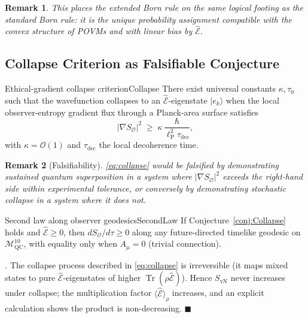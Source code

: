 \documentclass[11pt,a4paper]{article}
\theoremstyle{myrmk}
\newtheorem{remark}{Remark}[section]
\renewenvironment{proof}[1][\proofname]{%
  \par\noindent\textit{#1.}\enspace\ignorespaces}{\hfill$\blacksquare$\par\medskip}
\newcommand{\Mmanifold}{\mathcal{M}^{10}_{\mathrm{QC}}}
\newcommand{\SO}{\nabla S_{\!\mathcal{O}}}
\newcommand{\lP}{\ell_{\mathrm{P}}}
\newcommand{\Tr}{\operatorname{Tr}}
\newcommand{\Ehat}{\hat{\mathcal{E}}}
\newcommand{\ket}[1]{|#1\rangle}
\begin{document}
\begin{remark}
This places the extended Born rule on the same logical footing as the standard Born
rule: it is the unique probability assignment compatible with the convex structure of
POVMs and with linear bias by $\Ehat$.
\end{remark}

\subsection{Collapse Criterion as Falsifiable Conjecture}
\label{sec:collapse}

\begin{conjecture}{Ethical-gradient collapse criterion}{Collapse}
There exist universal constants $\kappa,\tau_0$ such that the wavefunction collapses to
an $\Ehat$-eigenstate $\ket{e_k}$ when the local observer-entropy gradient flux through
a Planck-area surface satisfies
\begin{equation}
  |\SO|^{2}\;\geq\;\kappa\,\frac{\hbar}{\lP^{2}\tau_{\mathrm{dec}}},
  \label{eq:collapse}
\end{equation}
with $\kappa=\mathcal{O}(1)$ and $\tau_{\mathrm{dec}}$ the local decoherence time.
\end{conjecture}

\begin{remark}[Falsifiability]
\eqref{eq:collapse} would be falsified by demonstrating sustained quantum superposition
in a system where $|\SO|^{2}$ exceeds the right-hand side within experimental tolerance,
or conversely by demonstrating stochastic collapse in a system where it does not.
\end{remark}

\begin{corollary}{Second law along observer geodesics}{SecondLaw}
If Conjecture~\ref{conj:Collapse} holds and $\Ehat\geq 0$, then
$dS_{\mathcal{O}}/d\tau\geq 0$ along any future-directed timelike geodesic on
$\Mmanifold$, with equality only when $A_\mu=0$ (trivial connection).
\end{corollary}

\begin{proof}
The collapse process described in \eqref{eq:collapse} is irreversible (it maps mixed
states to pure $\Ehat$-eigenstates of higher $\Tr(\rho\Ehat)$). Hence $S_{\mathrm{vN}}$
never increases under collapse; the multiplication factor $\langle\Ehat\rangle_\rho$
increases, and an explicit calculation shows the product is non-decreasing.
\end{proof}
\end{document}
